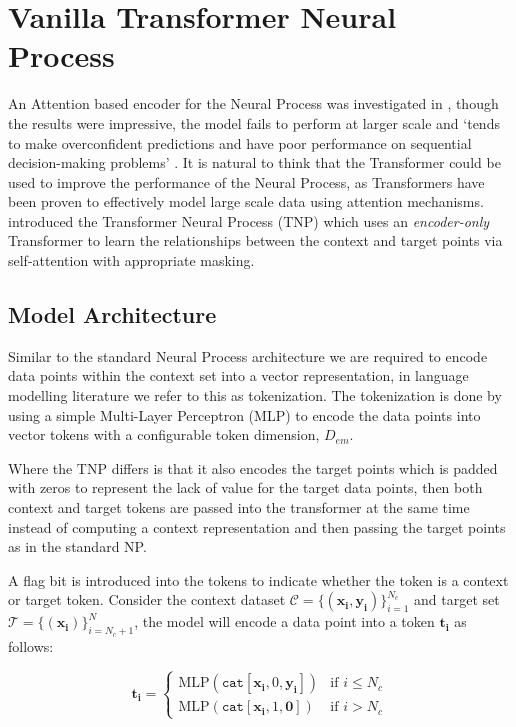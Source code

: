 \documentclass[../../main.tex]{subfiles}
\begin{document}
\section{Vanilla Transformer Neural Process}

An Attention based encoder for the Neural Process was investigated in \parencite{kim2019attentive}, though the results were impressive, the model fails to perform at larger scale and `tends to make overconfident predictions and have poor performance on sequential decision-making problems' \parencite{nguyen2023transformer}. It is natural to think that the Transformer \parencite{vaswani2017attention} could be used to improve the performance of the Neural Process, as Transformers have been proven to effectively model large scale data using attention mechanisms. \parencite{nguyen2023transformer} introduced the Transformer Neural Process (TNP) which uses an \emph{encoder-only} Transformer to learn the relationships between the context and target points via self-attention with appropriate masking. 

\subsection{Model Architecture}

Similar to the standard Neural Process architecture we are required to encode data points within the context set into a vector representation, in language modelling literature we refer to this as tokenization. The tokenization is done by using a simple Multi-Layer Perceptron (MLP) to encode the data points into vector tokens with a configurable token dimension, $D_{em}$.

Where the TNP differs is that it also encodes the target points which is padded with zeros to represent the lack of value for the target data points, then both context and target tokens are passed into the transformer at the same time instead of computing a context representation and then passing the target points as in the standard NP.

A flag bit is introduced into the tokens to indicate whether the token is a context or target token. Consider the context dataset $\mathcal{C} = \{(\bm{x_i}, \bm{y_i})\}_{i=1}^{N_c}$ and target set $\mathcal{T} = \{(\bm{x_i})\}_{i=N_c+1}^{N}$, the model will encode a data point into a token $\bm{t_i}$ as follows:

\[
	\bm{t_i} = \begin{cases}
		\text{MLP}(\texttt{cat}[\bm{x_i},  0, \bm{y_i}]) & \text{if } i \leq N_c \\
		\text{MLP}(\texttt{cat}[\bm{x_i},  1, \bm{ 0}]) & \text{if } i > N_c
	\end{cases}
\]
\end{document}

